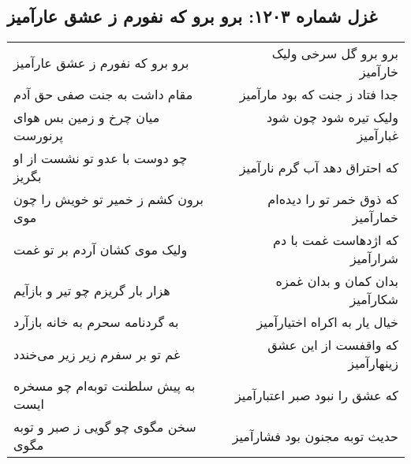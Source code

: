 \begin{center}
\section*{غزل شماره ۱۲۰۳: برو برو که نفورم ز عشق عارآمیز}
\label{sec:1203}
\begin{longtable}{l p{0.5cm} r}
برو برو که نفورم ز عشق عارآمیز
&&
برو برو گل سرخی ولیک خارآمیز
\\
مقام داشت به جنت صفی حق آدم
&&
جدا فتاد ز جنت که بود مارآمیز
\\
میان چرخ و زمین بس هوای پرنورست
&&
ولیک تیره شود چون شود غبارآمیز
\\
چو دوست با عدو تو نشست از او بگریز
&&
که احتراق دهد آب گرم نارآمیز
\\
برون کشم ز خمیر تو خویش را چون موی
&&
که ذوق خمر تو را دیده‌ام خمارآمیز
\\
ولیک موی کشان آردم بر تو غمت
&&
که اژدهاست غمت با دم شرارآمیز
\\
هزار بار گریزم چو تیر و بازآیم
&&
بدان کمان و بدان غمزه شکارآمیز
\\
به گردنامه سحرم به خانه بازآرد
&&
خیال یار به اکراه اختیارآمیز
\\
غم تو بر سفرم زیر زیر می‌خندد
&&
که واقفست از این عشق زینهارآمیز
\\
به پیش سلطنت توبه‌ام چو مسخره ایست
&&
که عشق را نبود صبر اعتبارآمیز
\\
سخن مگوی چو گویی ز صبر و توبه مگوی
&&
حدیث توبه مجنون بود فشارآمیز
\\
\end{longtable}
\end{center}
